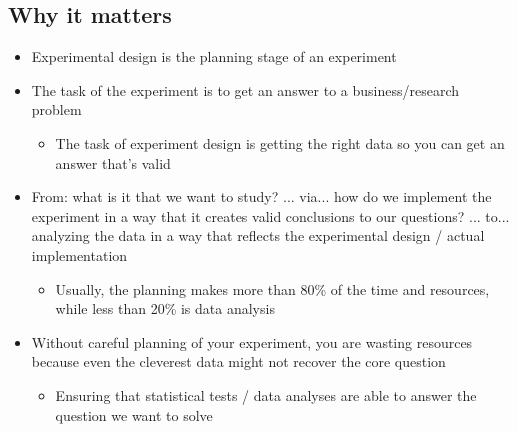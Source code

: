 \documentclass[10pt]{article}
\begin{document}
\subsection{Why it matters}
\begin{itemize}
    \item Experimental design is the planning stage of an experiment 
    \item The task of the experiment is to get an answer to a business/research problem 
    \begin{itemize}
        \item The task of experiment design is getting the right data so you can get an answer that's valid 
    \end{itemize}
    \item From: what is it that we want to study? ... via... how do we implement the experiment in a way that it creates valid conclusions to our questions? ... to... analyzing the data in a way that reflects the experimental design / actual implementation
    \begin{itemize}
        \item Usually, the planning makes more than 80\% of the time and resources, while less than 20\% is data analysis 
    \end{itemize}
    \item Without careful planning of your experiment, you are wasting resources because even the cleverest data might not recover the core question 
    \begin{itemize}
        \item Ensuring that statistical tests / data analyses are able to answer the question we want to solve 
    \end{itemize}
\end{itemize}
\end{document}
